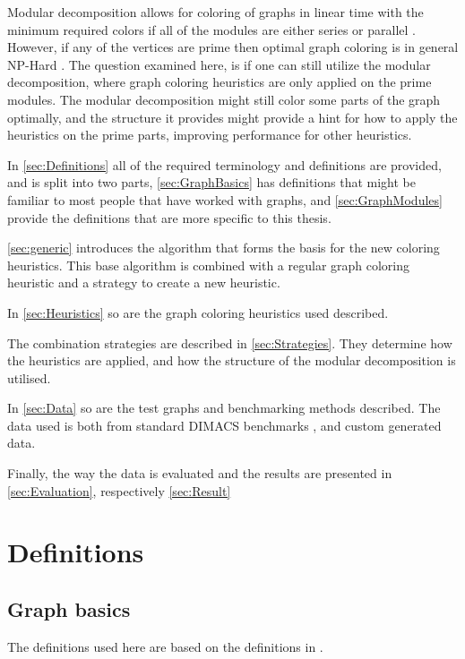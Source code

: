 \documentclass[a4paper]{article}
\begin{document}
Modular decomposition allows for coloring of graphs in linear time with the
minimum required colors if all of the modules are either  series or parallel
\cite{HCL}. However, if any of the vertices are prime then optimal graph
coloring is in general NP-Hard \cite{NPHard}. The question examined here, is if
one can still utilize the modular decomposition, where graph coloring
heuristics are only applied on the prime modules. The modular decomposition
might still color some parts of the graph optimally, and the structure it
provides might provide a hint for how to apply the heuristics on the prime
parts, improving performance for other heuristics.

In \autoref{sec:Definitions} all of the required terminology and definitions are
provided, and is split into two parts, \autoref{sec:GraphBasics} has definitions that might be
familiar to most people that have worked with graphs, and
\autoref{sec:GraphModules} provide the definitions that are more specific to
this thesis.

\autoref{sec:generic} introduces the algorithm that forms the basis for the new coloring heuristics.
This base algorithm is combined with a regular graph coloring heuristic and a strategy to create a
new heuristic.

In \autoref{sec:Heuristics} so are the graph coloring heuristics used described.

The combination strategies are described in \autoref{sec:Strategies}. They determine how 
the heuristics are applied, and how the structure of the modular decomposition is
utilised.

In \autoref{sec:Data} so are the test graphs and benchmarking methods described. The data
used is both from standard DIMACS benchmarks \cite{DIMACS}, and custom generated data.

Finally, the way the data is evaluated and the results are presented in 
\autoref{sec:Evaluation}, respectively \autoref{sec:Result}

\section{Definitions}
\label{sec:Definitions}

\subsection{Graph basics}
\label{sec:GraphBasics}

The definitions used here are based on the definitions in \cite{GraphBasics}. 
\end{document}
